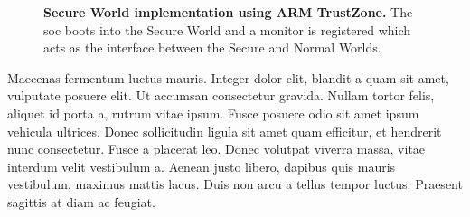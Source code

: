 \begin{figure}[htbp]
\makebox[\textwidth][c]{
}\caption[Arm TrustZone Example of Normal and Secure World]{\textbf{Secure World implementation using ARM TrustZone.}
The \gls{soc} boots into the Secure World and a monitor is registered which acts as the interface between the Secure and Normal Worlds.
\label{fig:trustzone}}
\end{figure}

Maecenas fermentum luctus mauris. Integer dolor elit, blandit a quam sit amet, vulputate posuere elit. Ut accumsan consectetur gravida. Nullam tortor felis, aliquet id porta a, rutrum vitae ipsum. Fusce posuere odio sit amet ipsum vehicula ultrices. Donec sollicitudin ligula sit amet quam efficitur, et hendrerit nunc consectetur. Fusce a placerat leo. Donec volutpat viverra massa, vitae interdum velit vestibulum a. Aenean justo libero, dapibus quis mauris vestibulum, maximus mattis lacus. Duis non arcu a tellus tempor luctus. Praesent sagittis at diam ac feugiat.